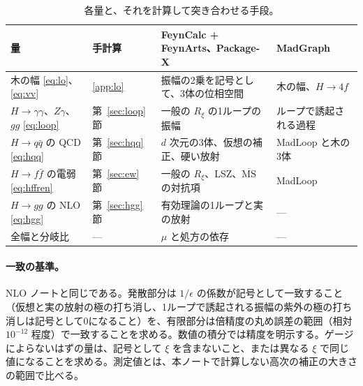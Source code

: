 \documentclass[a4paper,10pt]{ltjsarticle}
\newcommand{\MSbar}{\overline{\mathrm{MS}}}
\begin{document}
\begin{table}[htbp]
\centering\small
\caption{各量と、それを計算して突き合わせる手段。}
\label{tab:plan}
\begin{tabularx}{\linewidth}{>{\raggedright\arraybackslash}p{3.6cm}>{\raggedright\arraybackslash}p{1.6cm}>{\raggedright\arraybackslash}X>{\raggedright\arraybackslash}p{2.6cm}}
\toprule
\textbf{量} & \textbf{手計算} & \textbf{FeynCalc + FeynArts、Package-X} & \textbf{MadGraph} \\
\midrule
木の幅 \eqref{eq:lo}、\eqref{eq:vv} & \ref{app:lo} & 振幅の2乗を記号として、3体の位相空間 & 木の幅、$H\to4f$ \\
$H\to\gamma\gamma$、$Z\gamma$、$gg$ \eqref{eq:loop} & 第~\ref{sec:loop} 節 & 一般の $R_\xi$ の1ループの振幅 & ループで誘起される過程 \\
$H\to q\bar q$ の QCD \eqref{eq:hqq} & 第~\ref{sec:hqq} 節 & $d$ 次元の3体、仮想の補正、硬い放射 & MadLoop と木の3体 \\
$H\to f\bar f$ の電弱 \eqref{eq:hffren} & 第~\ref{sec:ew} 節 & 一般の $R_\xi$、LSZ、$\MSbar$ の対抗項 & MadLoop \\
$H\to gg$ の NLO \eqref{eq:hgg} & 第~\ref{sec:hgg} 節 & 有効理論の1ループと実の放射 & — \\
全幅と分岐比 & — & $\mu$ と処方の依存 & — \\
\bottomrule
\end{tabularx}
\end{table}

\paragraph{一致の基準。}NLO ノートと同じである。発散部分は $1/\epsilon$ の係数が記号として一致すること（仮想と実の放射の極の打ち消し、1ループで誘起される振幅の紫外の極の打ち消しは記号として0になること）を、有限部分は倍精度の丸め誤差の範囲（相対 $10^{-12}$ 程度）で一致することを求める。数値の積分では精度を明示する。ゲージによらないはずの量は、記号として $\xi$ を含まないこと、または異なる $\xi$ で同じ値になることを求める。測定値とは、本ノートで計算しない高次の補正の大きさの範囲で比べる。
\end{document}
